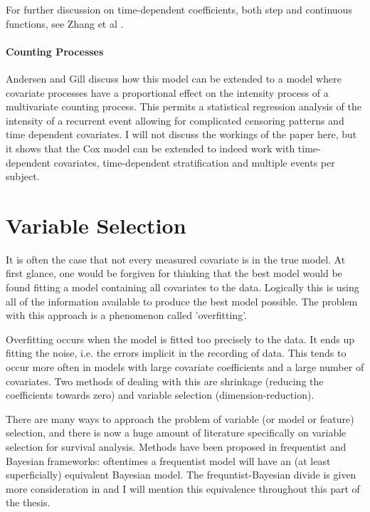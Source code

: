 For further discussion on time-dependent coefficients, both step and continuous functions, see Zhang et al .

\subsection{Counting Processes}

Andersen and Gill  discuss how this model can be extended to a model where covariate processes have a proportional effect on the intensity process of a multivariate counting process. This permits a statistical regression analysis of the intensity of a recurrent event allowing for complicated censoring patterns and time dependent covariates. I will not discuss the workings of the paper here, but it shows that the Cox model can be extended to indeed work with time-dependent covariates, time-dependent stratification and multiple events per subject. 

\newpage
\part{Variable Selection}\label{prt:variable-selection}

It is often the case that not every measured covariate is in the true model. At first glance, one would be forgiven for thinking that the best model would be found fitting a model containing all covariates to the data. Logically this is using all of the information available to produce the best model possible. The problem with this approach is a phenomenon called 'overfitting'.

Overfitting occurs when the model is fitted too precisely to the data. It ends up fitting the noise, i.e. the errors implicit in the recording of data. This tends to occur more often in models with large covariate coefficients and a large number of covariates. Two methods of dealing with this are shrinkage (reducing the coefficients towards zero) and variable selection (dimension-reduction).

There are many ways to approach the problem of variable (or model or feature) selection, and there is now a huge amount of literature specifically on variable selection for survival analysis. Methods have been proposed in frequentist and Bayesian frameworks: oftentimes a frequentist model will have an (at least superficially) equivalent Bayesian model. The frequntist-Bayesian divide is given more consideration in  and I will mention this equivalence throughout this part of the thesis.

